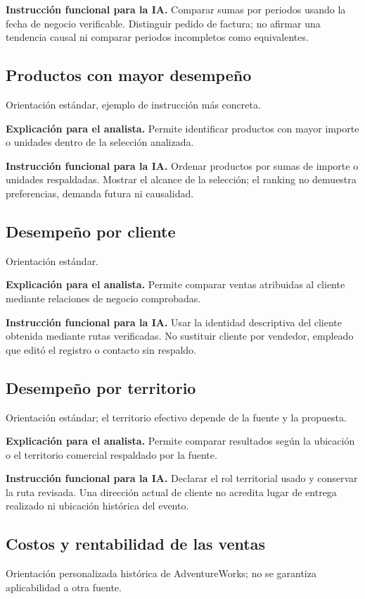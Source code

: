\textbf{Instrucción funcional para la IA.} Comparar sumas por periodos usando la fecha de negocio verificable. Distinguir pedido de factura; no afirmar una tendencia causal ni comparar periodos incompletos como equivalentes.

\subsection{Productos con mayor desempeño}
Orientación estándar, ejemplo de instrucción más concreta.

\textbf{Explicación para el analista.} Permite identificar productos con mayor importe o unidades dentro de la selección analizada.

\textbf{Instrucción funcional para la IA.} Ordenar productos por sumas de importe o unidades respaldadas. Mostrar el alcance de la selección; el ranking no demuestra preferencias, demanda futura ni causalidad.

\subsection{Desempeño por cliente}
Orientación estándar.

\textbf{Explicación para el analista.} Permite comparar ventas atribuidas al cliente mediante relaciones de negocio comprobadas.

\textbf{Instrucción funcional para la IA.} Usar la identidad descriptiva del cliente obtenida mediante rutas verificadas. No sustituir cliente por vendedor, empleado que editó el registro o contacto sin respaldo.

\subsection{Desempeño por territorio}
Orientación estándar; el territorio efectivo depende de la fuente y la propuesta.

\textbf{Explicación para el analista.} Permite comparar resultados según la ubicación o el territorio comercial respaldado por la fuente.

\textbf{Instrucción funcional para la IA.} Declarar el rol territorial usado y conservar la ruta revisada. Una dirección actual de cliente no acredita lugar de entrega realizado ni ubicación histórica del evento.

\subsection{Costos y rentabilidad de las ventas}
Orientación personalizada histórica de AdventureWorks; no se garantiza aplicabilidad a otra fuente.

